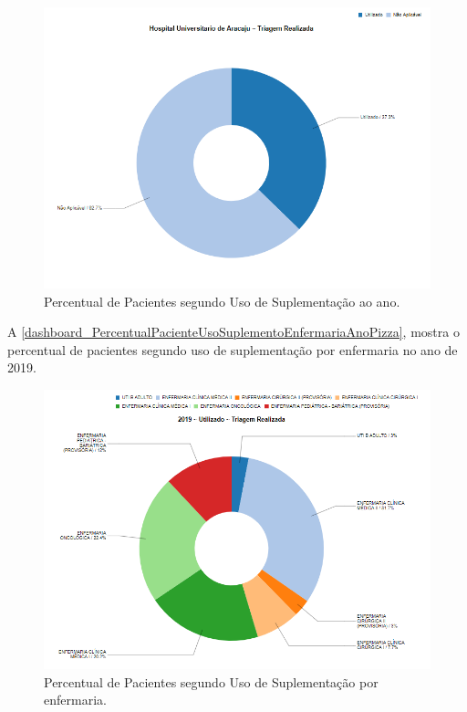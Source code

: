 \begin{figure}[htb]
	\caption{\label{dashboard_PercentualPacienteUsoSuplementoHospitalAnoPizza}Percentual de Pacientes segundo Uso de Suplementação ao ano.}
	\begin{center}
	    \includegraphics[scale=0.6]{Imagens/4.1.PercentualPacienteUsoSuplementoHospitalAnoPizza.png}
	\end{center}
\end{figure}

\newpage
A \autoref{dashboard_PercentualPacienteUsoSuplementoEnfermariaAnoPizza}, mostra o percentual de pacientes segundo uso de suplementação por enfermaria no ano de 2019.

\begin{figure}[htb]
	\caption{\label{dashboard_PercentualPacienteUsoSuplementoEnfermariaAnoPizza}Percentual de Pacientes segundo Uso de Suplementação por enfermaria.}
	\begin{center}
	    \includegraphics[scale=0.8]{Imagens/4.3.PercentualPacienteUsoSuplementoEnfermariaAnoPizza.png}
	\end{center}
\end{figure}

